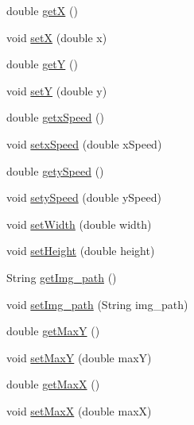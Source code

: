 \begin{DoxyCompactItemize}
\item 
double \hyperlink{classfr_1_1projet_1_1groupe40_1_1model_1_1_sprite_af7f38694af58b4066533c219d49d73ea}{getX} ()
\item 
void \hyperlink{classfr_1_1projet_1_1groupe40_1_1model_1_1_sprite_af0855c92d27754fcce4503011d4edf87}{setX} (double x)
\item 
double \hyperlink{classfr_1_1projet_1_1groupe40_1_1model_1_1_sprite_a18cb2df6b166f5bb89d32235db905d30}{getY} ()
\item 
void \hyperlink{classfr_1_1projet_1_1groupe40_1_1model_1_1_sprite_aa13dfac12e80175bce81f00d60ade84d}{setY} (double y)
\item 
double \hyperlink{classfr_1_1projet_1_1groupe40_1_1model_1_1_sprite_ac2c84f9ca07ca08e3fa382df1d530483}{getx\+Speed} ()
\item 
void \hyperlink{classfr_1_1projet_1_1groupe40_1_1model_1_1_sprite_a4666a43d078d094ba67cf0e776792f7f}{setx\+Speed} (double x\+Speed)
\item 
double \hyperlink{classfr_1_1projet_1_1groupe40_1_1model_1_1_sprite_a802670e3f445d427794f7c326947edc5}{gety\+Speed} ()
\item 
void \hyperlink{classfr_1_1projet_1_1groupe40_1_1model_1_1_sprite_a8bc4c43d662b4754038f1e2483ee733b}{sety\+Speed} (double y\+Speed)
\item 
void \hyperlink{classfr_1_1projet_1_1groupe40_1_1model_1_1_sprite_ab0d054cf838a6266fca1cc07c75aaf10}{set\+Width} (double width)
\item 
void \hyperlink{classfr_1_1projet_1_1groupe40_1_1model_1_1_sprite_a77b1a9a06d941378fdfc12873da17362}{set\+Height} (double height)
\item 
String \hyperlink{classfr_1_1projet_1_1groupe40_1_1model_1_1_sprite_a1774e558697c186bd807a162ac6e525f}{get\+Img\+\_\+path} ()
\item 
void \hyperlink{classfr_1_1projet_1_1groupe40_1_1model_1_1_sprite_a8c961c15aac6e6586568c654672f6529}{set\+Img\+\_\+path} (String img\+\_\+path)
\item 
double \hyperlink{classfr_1_1projet_1_1groupe40_1_1model_1_1_sprite_a0e742e113e2ebdfa7a8b3e2d03f32816}{get\+MaxY} ()
\item 
void \hyperlink{classfr_1_1projet_1_1groupe40_1_1model_1_1_sprite_a7ed0ebd26e50a78437b47a629dc5ed97}{set\+MaxY} (double maxY)
\item 
double \hyperlink{classfr_1_1projet_1_1groupe40_1_1model_1_1_sprite_ab7532fa08a3bec8f0fc93d3b5ce53ca7}{get\+MaxX} ()
\item 
void \hyperlink{classfr_1_1projet_1_1groupe40_1_1model_1_1_sprite_a00b465c36deae2b35c582d71d9ee7836}{set\+MaxX} (double maxX)
\end{DoxyCompactItemize}


